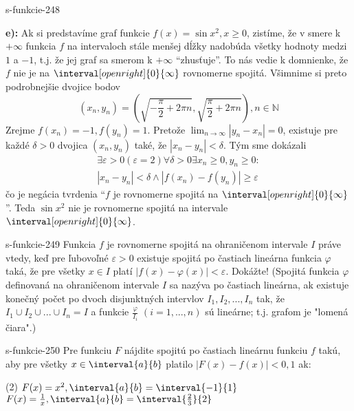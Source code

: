 \begin{defproblem}{s-funkcie-248}
\begin{solution}
  \textbf{e):}
  Ak si predstavíme graf funkcie $f(x)=\sin x^2,x \geq 0$, zistíme, že v smere k
  $+\infty$ funkcia $f$ na intervaloch stále menšej dĺžky nadobúda všetky
  hodnoty medzi $1$ a $-1$, t.j. že jej graf sa smerom k $+\infty$
  \enquote{zhusťuje}. To nás vedie k domnienke, že $f$ nie je na $\interval[open
  right]{0}{\infty}$ rovnomerne spojitá. Všimnime si preto podrobnejšie dvojice
  bodov
  \[
    (x_n,y_n)=(\sqrt{-\frac{\pi}{2}+2\pi n},\sqrt{\frac{\pi}{2}+2\pi
    n}),n\in \mathbb{N}
  \]
  Zrejme $f(x_n)=-1,f(y_n)=1$. Pretože $\lim_{n \rightarrow \infty}|y_n-x_n|=0$,
  existuje pre každé $\delta>0$ dvojica $(x_n,y_n)$ také, že $|x_n-y_n|<\delta$.
  Tým sme dokázali
  \begin{align*}
    \exists \varepsilon >0 (\varepsilon=2)
    \forall\delta>0\exists x_n \geq 0,y_n \geq 0: \\
    |x_n-y_n|<\delta \wedge |f(x_n)-f(y_n)| \geq \varepsilon
  \end{align*}
  čo je negácia tvrdenia \enquote{$f$ je rovnomerne spojitá na $\interval[open
  right]{0}{\infty}$}. Teda $\sin x^2$ nie je rovnomerne spojitá na intervale
  $\interval[open right]{0}{\infty}$.
\end{solution}
\end{defproblem}

\begin{defproblem}{s-funkcie-249}
Funkcia $f$ je rovnomerne spojitá na ohraničenom intervale $I$ práve vtedy, keď
pre ľubovoľné $\varepsilon >0$ existuje spojitá po častiach lineárna funkcia
$\varphi$ taká, že pre všetky $x \in I$ platí $|f(x)-\varphi(x)|< \varepsilon$.
Dokážte! (Spojitá funkcia $\varphi$ definovaná na ohraničenom intervale $I$ sa
nazýva po častiach lineárna, ak existuje konečný počet po dvoch disjunktných
intervlov $I_1,I_2,...,I_n$ tak, že $I_1 \cup I_2 \cup ... \cup I_n=I$ a funkcie
$\frac{\varphi}{I_i}$ $(i=1,...,n)$ sú lineárne; t.j. grafom je "lomená čiara".)
\end{defproblem}

\begin{defproblem}{s-funkcie-250}
Pre funkciu $F$ nájdite spojitú po častiach lineárnu funkciu $f$ takú, aby pre
všetky $x \in \interval{a}{b}$ platilo $|F(x)-f(x)|<0,1$ ak:
\begin{tasks}(2)
\task $F(x)=x^2, \interval{a}{b} = \interval{-1}{1}$
\task $F(x)=\frac{1}{x}, \interval{a}{b} = \interval{\frac{2}{3}}{2}$
\end{tasks}
\end{defproblem}

